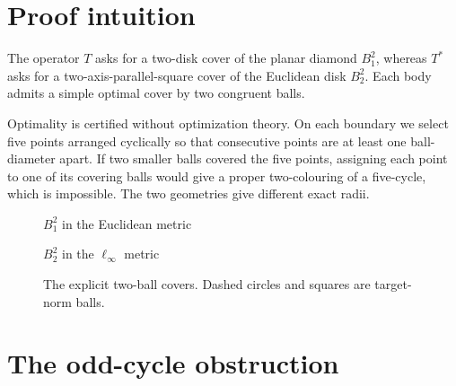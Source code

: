\documentclass[11pt]{article}
\begin{document}
\section{Proof intuition}

The operator $T$ asks for a two-disk cover of the planar diamond $B_1^2$,
whereas $T^*$ asks for a two-axis-parallel-square cover of the Euclidean disk
$B_2^2$.  Each body admits a simple optimal cover by two congruent balls.

Optimality is certified without optimization theory.  On each boundary we
select five points arranged cyclically so that consecutive points are at
least one ball-diameter apart.  If two smaller balls covered the five points,
assigning each point to one of its covering balls would give a proper
two-colouring of a five-cycle, which is impossible.  The two geometries give
different exact radii.

\begin{figure}[ht]
\centering
\begin{minipage}{0.47\textwidth}
\centering
{}

$B_1^2$ in the Euclidean metric
\end{minipage}\hfill
\begin{minipage}{0.47\textwidth}
\centering
{}

$B_2^2$ in the $\ell_\infty$ metric
\end{minipage}
\caption{The explicit two-ball covers.  Dashed circles and squares are target-norm balls.}
\label{fig:covers}
\end{figure}

\section{The odd-cycle obstruction}
\end{document}
